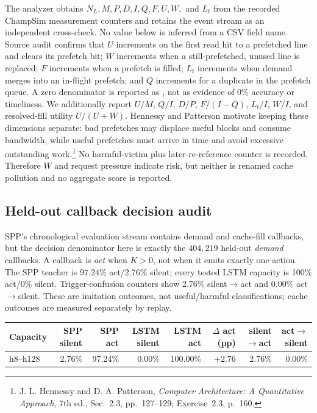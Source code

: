 \documentclass[10pt]{article}
\newcommand{\NA}{\textemdash}
\begin{document}
\begin{infobox}[title={\bfseries Exact interpretation boundaries}]
The analyzer obtains $N_L,M,P,D,I,Q,F,U,W,$ and $L_t$ from the recorded
ChampSim measurement counters and retains the event stream as an independent
cross-check. No value below is inferred from a CSV field name. Source audit
confirms that $U$ increments on the first read hit to a prefetched line and
clears its prefetch bit; $W$ increments when a still-prefetched, unused line is
replaced; $F$ increments when a prefetch is filled; $L_t$ increments when
demand merges into an in-flight prefetch; and $Q$ increments for a duplicate
in the prefetch queue. A zero denominator is reported as \NA, not as evidence
of 0\% accuracy or timeliness. We additionally report $U/M$, $Q/I$, $D/P$,
$F/(I-Q)$, $L_t/I$, $W/I$, and resolved-fill utility $U/(U+W)$.
Hennessy and Patterson motivate keeping these dimensions separate: bad
prefetches may displace useful blocks and consume bandwidth, while useful
prefetches must arrive in time and avoid excessive outstanding
work.\footnote{J. L. Hennessy and D. A. Patterson, \emph{Computer
Architecture: A Quantitative Approach}, 7th ed., Sec.~2.3, pp.~127--129;
Exercise~2.3, p.~160.} No harmful-victim plus later-re-reference counter is
recorded. Therefore $W$ and request pressure indicate risk, but neither is
renamed cache pollution and no aggregate score is reported.
\end{infobox}

\subsection*{Held-out callback decision audit}
\begin{infobox}[title={\bfseries Dense teacher, always-act student}]
SPP's chronological evaluation stream contains demand and cache-fill
callbacks, but the decision denominator here is exactly the $404{,}219$
held-out \emph{demand} callbacks.  A callback is \emph{act} when $K>0$, not
when it emits exactly one action.  The SPP teacher is 97.24\% act/2.76\%
silent; every tested LSTM capacity is 100\% act/0\% silent.  Trigger-confusion
counters show 2.76\% silent$\to$act and 0.00\% act$\to$silent.  These are
imitation outcomes, not useful/harmful classifications; cache outcomes are
measured separately by replay.
\end{infobox}

\begin{center}\scriptsize
\begin{tabular}{@{}lrrrrrrr@{}}
\toprule
Capacity & SPP silent & SPP act & LSTM silent & LSTM act &
$\Delta$ act (pp) & silent$\to$act & act$\to$silent \\
\midrule
h8--h128 & 2.76\% & 97.24\% & 0.00\% & 100.00\% &
+2.76 & 2.76\% & 0.00\% \\
\bottomrule
\end{tabular}
\end{center}
\end{document}
